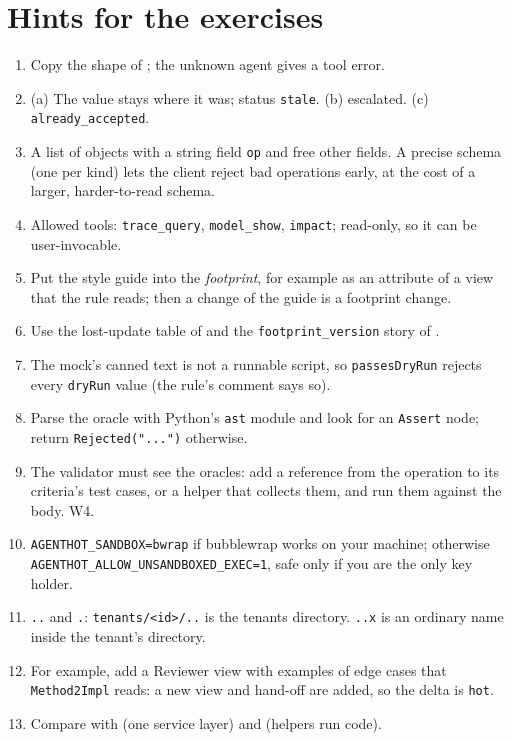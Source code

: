 \documentclass[10pt,a4paper]{article}
\newcommand{\W}[1]{\textsf{W#1}}
\newcommand{\code}[1]{\texttt{#1}}
\newcommand{\mcptool}[1]{\texttt{#1}}
\begin{document}
\section{Hints for the exercises}\label{app:hints}

\begin{enumerate}[leftmargin=1.6em, itemsep=2pt]
\item Copy the shape of ; the unknown agent gives a tool error.
\item (a) The value stays where it was; status \code{stale}. (b) escalated. (c) \code{already\_accepted}.
\item A list of objects with a string field \code{op} and free other fields. A precise schema (one per kind) lets the client reject bad operations early, at the cost of a larger, harder-to-read schema.
\item Allowed tools: \mcptool{trace\_query}, \mcptool{model\_show}, \mcptool{impact}; read-only, so it can be user-invocable.
\item Put the style guide into the \emph{footprint}, for example as an attribute of a view that the rule reads; then a change of the guide is a footprint change.
\item Use the lost-update table of  and the \code{footprint\_version} story of .
\item The mock's canned text is not a runnable script, so \code{passesDryRun} rejects every \code{dryRun} value (the rule's comment says so).
\item Parse the oracle with Python's \code{ast} module and look for an \code{Assert} node; return \code{Rejected("...")} otherwise.
\item The validator must see the oracles: add a reference from the operation to its criteria's test cases, or a helper that collects them, and run them against the body. \W{4}.
\item \code{AGENTHOT\_SANDBOX=bwrap} if bubblewrap works on your machine; otherwise \code{AGENTHOT\_ALLOW\_UNSANDBOXED\_EXEC=1}, safe only if you are the only key holder.
\item \code{..} and \code{.}: \code{tenants/<id>/..} is the tenants directory. \code{..x} is an ordinary name inside the tenant's directory.
\item For example, add a Reviewer view with examples of edge cases that \code{Method2Impl} reads: a new view and hand-off are added, so the delta is \code{hot}.
\item Compare with  (one service layer) and  (helpers run code).
\end{enumerate}



\end{document}
